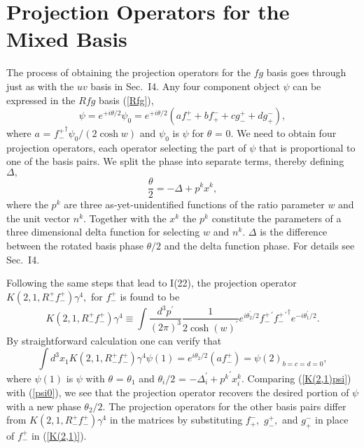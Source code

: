 \documentclass[a4paper,12pt]{article}
\begin{document}
 \section{Projection Operators for the Mixed Basis} \label{projections} %


	The process of obtaining the projection operators for the $fg$ basis goes through just as with the $uv$ basis in Sec.~I4. Any four component object $\psi$ can be expressed in the $Rfg$ basis (\ref{Rfg}),
\begin{equation}	\label{psi0}
\psi = e^{+i\theta/2} \psi_{0} = e^{+i\theta/2}(a f_{-}^{+} + b f_{+}^{-} + c g_{-}^{+} + d g_{+}^{-}), 
\end{equation}
where $a$ = ${f^{+}_{-}}^{\dagger} \psi_{0}/ (2 \cosh{w})$ and $\psi_{0}$ is $\psi$ for $\theta$ = 0. We need to obtain four projection operators, each operator selecting the part of $\psi$ that is proportional to one of the basis pairs. We split the phase into separate terms, thereby defining $\Delta,$
\begin{equation}	\label{psi,theta}
\frac{\theta}{2} = - \Delta + p^{k} x^{k},
\end{equation}
where the $p^{k}$ are three as-yet-unidentified functions of the ratio parameter $w$ and the unit vector $n^{k}.$ Together with the $x^{k}$ the $p^{k}$ constitute the parameters of a three dimensional delta function for selecting $w$ and $n^{k}.$ $\Delta$ is the difference between the rotated basis phase $\theta/2$ and the delta function phase. For details see Sec.~I4.

 	Following the same steps that lead to I(22), the projection operator $K(2,1,R_{-}^{+} f_{-}^{+}) \gamma^{4},$ for $f_{-}^{+}$ is found to be  
\begin{equation}	\label{K(2,1)}
 K(2,1,R_{-}^{+} f_{-}^{+}) \gamma^{4} \equiv \int \frac{d^3 p^{\prime} }{(2 \pi)^3} \frac{1}{2 {\cosh{(w)}}^{\prime}}e^{i \theta_{2}^{\prime}/2}  f_{-}^{+ \, \prime} {f_{-}^{+ \, \prime }}^{\dagger} e^{ -i \theta_{1}^{\prime}/2} .
\end{equation} 
By straightforward calculation one can verify that
\begin{equation}	\label{K(2,1)psi}
 \int d^{3} x_{1} K(2,1,R_{-}^{+} f_{-}^{+}) \gamma^{4} \psi(1) =  e^{i \theta_{2} / 2} (a f_{-}^{+}) = \psi(2)_{b=c=d=0} ,
\end{equation} 
where $\psi(1)$ is $\psi$ with $\theta$ = $\theta_{1}$ and $ \theta_{i}/2 $ = $- \Delta_{i}^{\prime} +  {p^{k }}^{\prime} x_{i}^{k} .$
Comparing (\ref{K(2,1)psi}) with (\ref{psi0}), we see that the projection operator recovers the desired portion of $\psi$ with a new phase $\theta_{2} / 2.$ The projection operators for the other basis pairs differ from $K(2,1,R_{-}^{+} f_{-}^{+}) \gamma^{4}$ in the matrices by substituting $f_{+}^{-},$ $g_{-}^{+},$ and $g_{+}^{-}$ in place of $f_{-}^{+}$ in (\ref{K(2,1)}).
\end{document}
